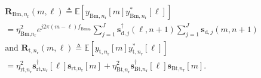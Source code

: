 \documentclass[9pt,journal]{IEEEtran}
\newcommand{\paren}[1]{\left({#1}\right)}
\newcommand{\bracket}[1]{{\left [{#1}\right ]}}
\newcommand{\rr}{_\mathrm{r}}
\newcommand{\B}{\textrm{B}}
\newcommand{\rnr}{_{\mathrm{r},n_\mathrm{r}}}
\newcommand{\target}{\mathrm{t}}
\newcommand{\PBj}{\mathbf{P}_{\textrm{d},j}\bracket{k}}
\newcommand{\PBjm}{\mathbf{P}_{\textrm{d},j}\bracket{m}}
\begin{document}
\begin{align}
&\mathbf{R}_{\mathrm{Bm},n\rr}\paren{m,\ell}\triangleq\mathbb{E}\bracket{y_{\mathrm{Bm},n\rr}\bracket{m}y^\ast_{\mathrm{Bm},n\rr}\bracket{\ell}}\nonumber\\
&=\eta^2_{\textrm{Bm,}n\rr}e^{j2\pi\paren{m-\ell}f_{\mathrm{Bm}n\rr}} \sum_{j=1}^{\mathit{J}}\mathbf{s}^\dagger_{\textrm{d},j}\paren{\ell,n+1}\sum_{j=1}^{\mathit{J}}\mathbf{s}_{\textrm{d},j}\paren{m,n+1}\\
&\textrm{and }\mathbf{R}_{\target,n\rr}\paren{m,\ell}\triangleq\mathbb{E}\bracket{y_{\mathrm{t},n\rr}\bracket{m}y^\ast_{\mathrm{t},n\rr}\bracket{\ell}}\nonumber\\
&=\eta^2_{\textrm{rt,}n\rr}\mathbf{s}^\dagger_{\textrm{rt,}n\rr}\bracket{\ell}\mathbf{s}_{\textrm{rt,}n\rr}\bracket{m}+\eta^2_{\textrm{Bt,}n\rr}\mathbf{s}^\dagger_{\textrm{Bt,}n\rr}\bracket{\ell}\mathbf{s}_{\textrm{Bt,}n\rr}\bracket{m}.
\end{align}\normalsize
	
\end{document}
